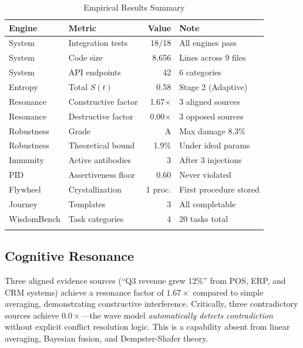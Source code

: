 \documentclass[11pt,a4paper]{article}
\begin{document}
\begin{table}[h]
\centering
\caption{Empirical Results Summary}
\label{tab:results}
\begin{tabular}{llrl}
\toprule
\textbf{Engine} & \textbf{Metric} & \textbf{Value} & \textbf{Note} \\
\midrule
System       & Integration tests     & 18/18     & All engines pass \\
System       & Code size             & 8,656     & Lines across 9 files \\
System       & API endpoints         & 42        & 6 categories \\
\midrule
Entropy      & Total $S(t)$          & 0.58      & Stage 2 (Adaptive) \\
Resonance    & Constructive factor   & 1.67$\times$ & 3 aligned sources \\
Resonance    & Destructive factor    & 0.00$\times$ & 3 opposed sources \\
Robustness   & Grade                 & A         & Max damage 8.3\% \\
Robustness   & Theoretical bound     & 1.9\%     & Under ideal params \\
Immunity     & Active antibodies     & 3         & After 3 injections \\
PID          & Assertiveness floor   & 0.60      & Never violated \\
Flywheel     & Crystallization       & 1 proc.   & First procedure stored \\
Journey      & Templates             & 3         & All completable \\
WisdomBench  & Task categories       & 4         & 20 tasks total \\\\
\bottomrule
\end{tabular}
\end{table}

\subsection{Cognitive Resonance}

Three aligned evidence sources (``Q3 revenue grew 12\%'' from POS, ERP,
and CRM systems) achieve a resonance factor of $1.67\times$ compared to
simple averaging, demonstrating constructive interference. Critically,
three contradictory sources achieve $0.0\times$---the wave model
\emph{automatically detects contradiction} without explicit conflict
resolution logic. This is a capability absent from linear averaging,
Bayesian fusion, and Dempster-Shafer theory.
\end{document}
